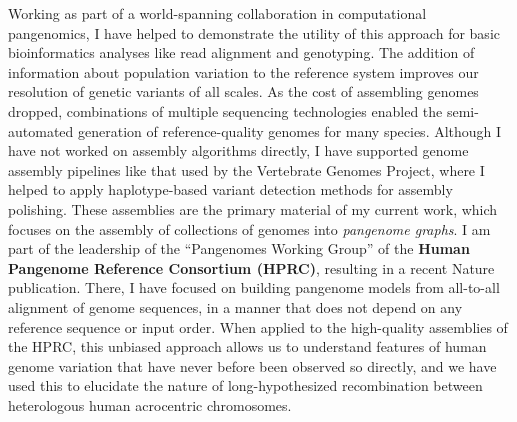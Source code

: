 \documentclass{nihbiosketch}
\begin{document}
\begin{statement}
Working as part of a world-spanning collaboration in computational pangenomics, I have helped to demonstrate the utility of this approach for basic bioinformatics analyses like read alignment and genotyping.
The addition of information about population variation to the reference system improves our resolution of genetic variants of all scales.
As the cost of assembling genomes dropped, combinations of multiple sequencing technologies enabled the semi-automated generation of reference-quality genomes for many species.
Although I have not worked on assembly algorithms directly, I have supported genome assembly pipelines like that used by the Vertebrate Genomes Project, where I helped to apply haplotype-based variant detection methods for assembly polishing.
These assemblies are the primary material of my current work, which focuses on the assembly of collections of genomes into \emph{pangenome graphs}.
I am part of the leadership of the ``Pangenomes Working Group'' of the \textbf{Human Pangenome Reference Consortium (HPRC)}, resulting in a recent Nature publication.
There, I have focused on building pangenome models from all-to-all alignment of genome sequences, in a manner that does not depend on any reference sequence or input order.
When applied to the high-quality assemblies of the HPRC, this unbiased approach allows us to understand features of human genome variation that have never before been observed so directly, and we have used this to elucidate the nature of long-hypothesized recombination between heterologous human acrocentric chromosomes.






\end{statement}
\end{document}
